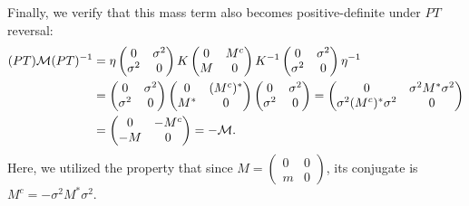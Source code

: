 Finally, we verify that this mass term also becomes positive-definite under $PT$ reversal:
\begin{equation}
\begin{aligned}
    (PT){\cal M}(PT)^{-1}&=\eta\begin{pmatrix}0&\sigma^2\\ \sigma^2&0\end{pmatrix}K \begin{pmatrix} 0 & M^c \\ M & 0 \end{pmatrix}K^{-1}\begin{pmatrix}0&\sigma^2\\ \sigma^2&0\end{pmatrix}\eta^{-1}\\
    &=\begin{pmatrix}0&\sigma^2\\ \sigma^2&0\end{pmatrix} \begin{pmatrix} 0 & (M^c)^* \\ M^* & 0 \end{pmatrix}\begin{pmatrix}0&\sigma^2\\ \sigma^2&0\end{pmatrix}=\begin{pmatrix} 0 & \sigma^2M^*\sigma^2 \\ \sigma^2(M^c)^*\sigma^2 & 0 \end{pmatrix}\\
    &=\begin{pmatrix} 0 & -M^c \\ -M & 0 \end{pmatrix}=-{\cal M}.
\end{aligned}
\end{equation}
Here, we utilized the property that since $M=\begin{pmatrix}0&0\\m&0\end{pmatrix}$, its conjugate is $ M^c=-\sigma^2M^*\sigma^2$.


